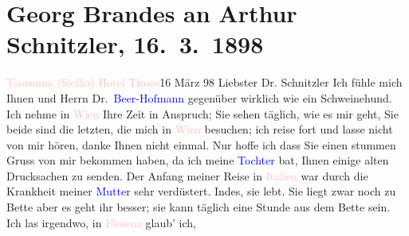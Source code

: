 

               \section[Georg Brandes an Arthur Schnitzler, 16. 3. 1898]{ Georg Brandes an Arthur Schnitzler, 16. 3. 1898}\nopagebreak{}\rehead{ }\normalsize\beginnumbering{} \toendnotes[C]{\smallbreak\pagebreak[2]} 
\toendnotes[C]{\smallbreak}\pstart
           \raggedleft{}{\pb}\textcolor{pink}{Taormina (Sicilia) Hotel Timeo}{}\ledrightnote{\textcolor{pink}{Hotel Timeo}}{\\}16 März 98\pend
           \pstart\center{}Liebster Dr. Schnitzler\pend\pstart
           Ich fühle mich Ihnen und Herrn Dr. \textcolor{blue}{Beer-Hofmann}{}\ledrightnote{\textcolor{blue}{Richard Beer-Hofmann}} gegenüber wirklich wie ein Schweinehund. Ich nehme
                    in \textcolor{pink}{Wien}{}\ledrightnote{\textcolor{pink}{Wien}} Ihre Zeit in Anspruch; Sie sehen
                    täglich, wie es mir geht, Sie beide sind die letzten, die mich in \textcolor{pink}{Wien}{}\ledrightnote{\textcolor{pink}{Wien}} besuchen; ich reise fort und lasse nicht von
                    mir hören, danke Ihnen nicht einmal. Nur hoffe ich dass Sie einen stummen Gruss
                    von mir bekommen haben, da ich meine \textcolor{blue}{Tochter}{} bat, Ihnen einige alten Drucksachen zu senden.\pend
           \pstart
           Der Anfang meiner Reise in \textcolor{pink}{Italien}{}\ledrightnote{\textcolor{pink}{Italien}} war durch die Krankheit meiner \textcolor{blue}{Mutter}{}
               sehr {\pb}verdüstert. Indes, sie lebt. Sie liegt zwar noch zu Bette aber es geht ihr
                    besser; sie kann täglich eine Stunde aus dem Bette sein.\pend
           \pstart
           Ich las irgendwo, in \textcolor{pink}{Florenz}{}\ledrightnote{\textcolor{pink}{Florenz}} glaub’ ich,
